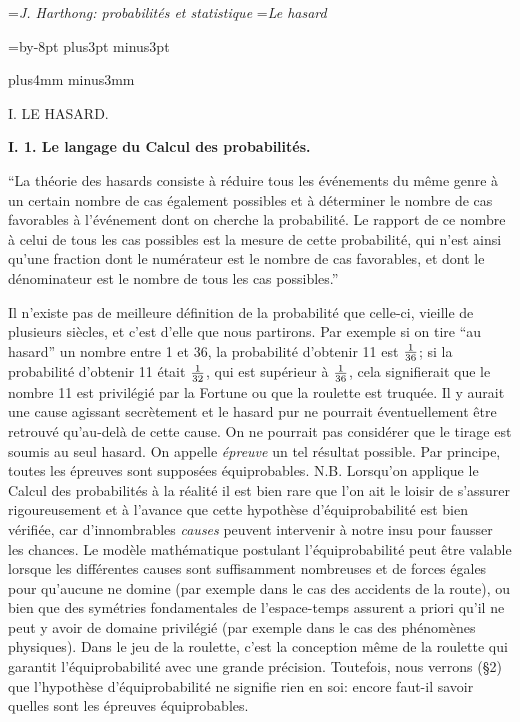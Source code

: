 

\vsize=219mm

\auteurcourant={\sl J. Harthong: probabilit\'es et statistique}
\titrecourant={\sl Le hasard}
 
\newdimen\blocksize  \blocksize=\vsize \advance\blocksize by-8pt 
\medskipamount=6pt plus3pt minus3pt 
 
 
\null\vskip10mm plus4mm minus3mm 
 
\centerline{\tit I. LE HASARD.} 
\vskip10mm 
{\bf I. 1. Le langage du Calcul des probabilit\'es.} 
\medskip 
{\cit ``La th\'eorie des hasards consiste \`a r\'eduire tous les 
\'ev\'enements du m\^eme genre \`a un certain nombre de cas \'egalement
possibles et \`a d\'eterminer le nombre de cas favorables \`a l'\'ev\'enement
dont on cherche la probabilit\'e. Le rapport de ce nombre \`a celui de tous 
les cas possibles est la mesure de cette probabilit\'e, qui n'est ainsi 
qu'une fraction dont le num\'erateur est le nombre de cas favorables, et 
dont le d\'enominateur est le nombre de tous les cas possibles.''\par}
\smallskip
{}
\medskip
Il n'existe pas de meilleure d\'efinition de la probabilit\'e que celle-ci, vieille de plusieurs si\`ecles, et c'est d'elle que nous partirons.
\medskip
Par exemple si on tire ``au  
hasard''  un nombre entre 1 et 36, la probabilit\'e d'obtenir 11 est $1 
\over 36$; si  la probabilit\'e d'obtenir 11 \'etait $1 \over 32$, qui est 
sup\'erieur \`a $1 \over 36$, cela signifierait que le nombre 11 est 
privil\'egi\'e par la Fortune ou que la roulette est truqu\'ee. Il y aurait 
une  cause agissant secr\`etement et le hasard pur ne pourrait 
\'eventuellement \^etre retrouv\'e qu'au-del\`a de cette cause. On 
ne pourrait pas consid\'erer que le tirage est soumis au seul hasard.  
\medskip 
On appelle {\it \'epreuve} un tel r\'esultat possible. Par principe, toutes  
les \'epreuves sont suppos\'ees \'equiprobables. 
\medskip 
{\eightpoint N.B.  Lorsqu'on applique le Calcul des probabilit\'es \`a  
la r\'ealit\'e il est bien rare que l'on ait le loisir de s'assurer  
rigoureusement  et \`a l'avance que cette hypoth\`ese 
d'\'equiprobabilit\'e est bien v\'erifi\'ee, car d'innombrables {\it 
causes} peuvent intervenir \`a notre insu pour fausser les chances. Le 
mod\`ele math\'ematique postulant l'\'equiprobabilit\'e peut \^etre 
valable lorsque les diff\'erentes causes sont suffisamment nombreuses 
et de forces \'egales pour qu'aucune ne domine (par exemple dans le cas 
des accidents de la route), ou bien que des sym\'etries fondamentales  
de l'espace-temps assurent a priori qu'il ne peut y avoir de domaine 
privil\'egi\'e (par exemple dans le cas des ph\'enom\`enes physiques). 
Dans le jeu de la roulette, c'est la conception m\^eme de la roulette qui 
garantit l'\'equiprobabilit\'e avec une grande pr\'ecision. Toutefois, 
nous verrons (\S 2) que l'hypoth\`ese  d'\'equiprobabilit\'e ne signifie 
rien en soi: encore faut-il savoir quelles sont les \'epreuves 
\'equiprobables.} 
